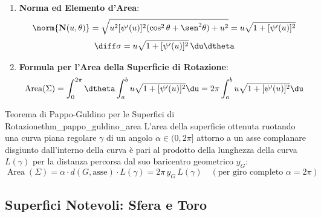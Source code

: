 \begin{metodo}
\begin{enumerate}
\begin{align*}
    \end{align*}
    \item \textbf{Norma ed Elemento d'Area}:
    \[
    \norm{\mathbf{N}(u,\theta)} = \sqrt{u^2 [\psi'(u)]^2 (\cos^2\theta + \sen^2\theta) + u^2} = u \sqrt{1 + [\psi'(u)]^2}
    \]
    \[
    \diff\sigma = u \sqrt{1 + [\psi'(u)]^2} \, \du\dtheta
    \]
    \item \textbf{Formula per l'Area della Superficie di Rotazione}:
    \[
    \operatorname{Area}(\Sigma) = \int_{0}^{2\pi} \dtheta \int_{a}^{b} u \sqrt{1 + [\psi'(u)]^2} \du = 2\pi \int_{a}^{b} u \sqrt{1 + [\psi'(u)]^2} \du
    \]
\end{enumerate}
\end{metodo}

\begin{teorema}{Teorema di Pappo-Guldino per le Superfici di Rotazione}{thm_pappo_guldino_area}
L'area della superficie ottenuta ruotando una curva piana regolare $\gamma$ di un angolo $\alpha \in (0, 2\pi]$ attorno a un asse complanare disgiunto dall'interno della curva è pari al prodotto della lunghezza della curva $L(\gamma)$ per la distanza percorsa dal suo baricentro geometrico $y_G$:
\[
\operatorname{Area}(\Sigma) = \alpha \cdot d(G, \text{asse}) \cdot L(\gamma) = 2\pi \, y_G \, L(\gamma) \quad (\text{per giro completo } \alpha = 2\pi)
\]
\end{teorema}

\subsection{Superfici Notevoli: Sfera e Toro}

